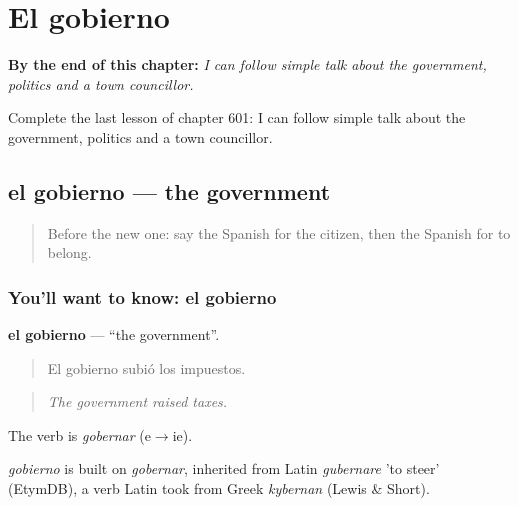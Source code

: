 
\chapter{El gobierno}
\label{ch:es-el-gobierno}

\begin{chapteropening}
\textbf{By the end of this chapter:} \emph{I can follow simple talk about the government, politics and a town councillor.}

Complete the last lesson of chapter 601: I can follow simple talk about the government, politics and a town councillor.
\end{chapteropening}

\section[el gobierno]{el gobierno — the government}

\label{lesson:ES-C601-gobierno}



\begin{quote}
Before the new one: say the Spanish for the citizen, then the Spanish for to belong.
\end{quote}

\subsection*{You'll want to know: el gobierno}
\textbf{el gobierno} — \textquotedblleft{}the government\textquotedblright{}.

\begin{quote}
El gobierno subió los impuestos.
\end{quote}

\begin{quote}
\emph{The government raised taxes.}
\end{quote}

The verb is \emph{gobernar} (e$\to$ie).

\begin{cousinweb}
\emph{gobierno} is built on \emph{gobernar}, inherited from Latin \emph{gubernare} 'to steer' (EtymDB), a verb Latin took from Greek \emph{kybernan} (Lewis \& Short).
\end{cousinweb}

